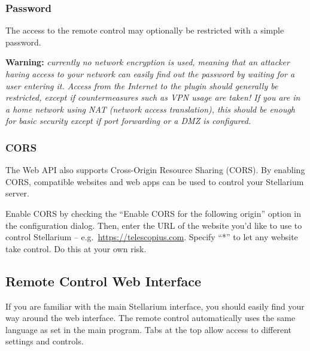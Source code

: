 \subsubsection{Password}
The access to the remote control may optionally be restricted with a simple 
password.

\textbf{Warning:} \emph{currently no network encryption is used, meaning that 
an attacker having access to your network can easily find out the password by 
waiting for a user entering it. Access from the Internet to the 
plugin should generally be restricted, except if countermeasures such as VPN 
usage are taken! If you are in a home network using NAT (network access 
translation), this should be enough for basic security except if port 
forwarding or a DMZ is configured.}

\subsubsection{CORS}
The Web API also supports Cross-Origin Resource Sharing (CORS). By enabling CORS,
compatible websites and web apps can be used to control your Stellarium server.

Enable CORS by checking the ``Enable CORS for the following origin'' option in the
configuration dialog. Then, enter the URL of the website you'd like to use to control
Stellarium -- e.g.\ \url{https://telescopius.com}. Specify ``*'' to let any website
take control. Do this at your own risk.


\subsection{Remote Control Web Interface}
\label{sec:plugins:RemoteControl:webinterface}


If you are familiar with the main Stellarium interface, you should easily find 
your way around the web interface. 
The remote control automatically uses the same language as set in the main program. 
Tabs at the top allow access to different settings and controls. 

